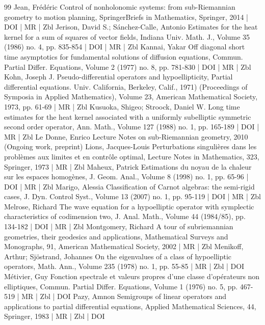 \begin{thebibliography}{99}
Jean, Frédéric Control of nonholonomic systems: from sub-Riemannian geometry to motion planning, SpringerBriefs in Mathematics, Springer, 2014 | DOI | MR | Zbl
Jerison, David S.; Sánchez-Calle, Antonio Estimates for the heat kernel for a sum of squares of vector fields, Indiana Univ. Math. J., Volume 35 (1986) no. 4, pp. 835-854 | DOI | MR | Zbl
Kannai, Yakar Off diagonal short time asymptotics for fundamental solutions of diffusion equations, Commun. Partial Differ. Equations, Volume 2 (1977) no. 8, pp. 781-830 | DOI | MR | Zbl
Kohn, Joseph J. Pseudo-differential operators and hypoellipticity, Partial differential equations. Univ. California, Berkeley, Calif., 1971) (Proceedings of Symposia in Applied Mathematics), Volume 23, American Mathematical Society, 1973, pp. 61-69 | MR | Zbl
Kusuoka, Shigeo; Stroock, Daniel W. Long time estimates for the heat kernel associated with a uniformly subelliptic symmetric second order operator, Ann. Math., Volume 127 (1988) no. 1, pp. 165-189 | DOI | MR | Zbl
Le Donne, Enrico Lecture Notes on sub-Riemannian geometry, 2010 (Ongoing work, preprint)
Lions, Jacques-Louis Perturbations singulières dans les problèmes aux limites et en contrôle optimal, Lecture Notes in Mathematics, 323, Springer, 1973 | MR | Zbl
Maheux, Patrick Estimations du noyau de la chaleur sur les espaces homogènes, J. Geom. Anal., Volume 8 (1998) no. 1, pp. 65-96 | DOI | MR | Zbl
Marigo, Alessia Classification of Carnot algebras: the semi-rigid cases, J. Dyn. Control Syst., Volume 13 (2007) no. 1, pp. 95-119 | DOI | MR | Zbl
Melrose, Richard The wave equation for a hypoelliptic operator with symplectic characteristics of codimension two, J. Anal. Math., Volume 44 (1984/85), pp. 134-182 | DOI | MR | Zbl
Montgomery, Richard A tour of subriemannian geometries, their geodesics and applications, Mathematical Surveys and Monographs, 91, American Mathematical Society, 2002 | MR | Zbl
Menikoff, Arthur; Sjöstrand, Johannes On the eigenvalues of a class of hypoelliptic operators, Math. Ann., Volume 235 (1978) no. 1, pp. 55-85 | MR | Zbl | DOI
Métivier, Guy Fonction spectrale et valeurs propres d’une classe d’opérateurs non elliptiques, Commun. Partial Differ. Equations, Volume 1 (1976) no. 5, pp. 467-519 | MR | Zbl | DOI
Pazy, Amnon Semigroups of linear operators and applications to partial differential equations, Applied Mathematical Sciences, 44, Springer, 1983 | MR | Zbl | DOI

\end{thebibliography}
